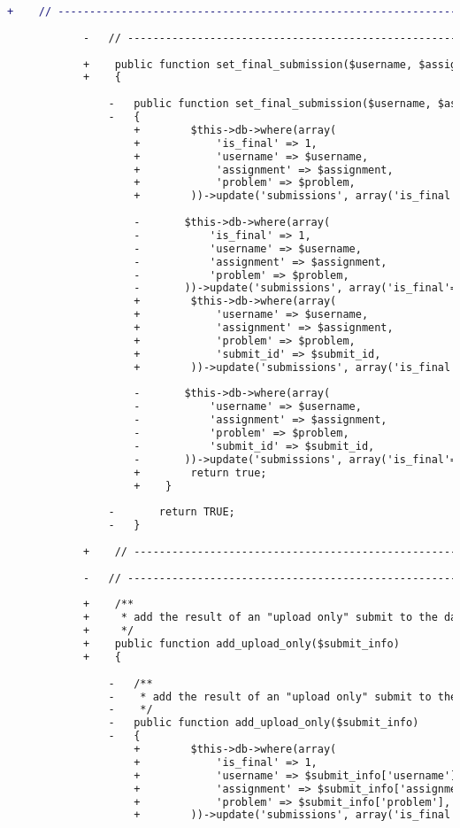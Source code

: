 \begin{lstlisting}[language=diff, caption=Perubahan pada kode Submit\_model.php]
			+    // ------------------------------------------------------------------------
			
			-	// ------------------------------------------------------------------------
			
			+    public function set_final_submission($username, $assignment, $problem, $submit_id)
			+    {
				
				-	public function set_final_submission($username, $assignment, $problem, $submit_id)
				-	{
					+        $this->db->where(array(
					+            'is_final' => 1,
					+            'username' => $username,
					+            'assignment' => $assignment,
					+            'problem' => $problem,
					+        ))->update('submissions', array('is_final' => 0));
					
					-		$this->db->where(array(
					-			'is_final' => 1,
					-			'username' => $username,
					-			'assignment' => $assignment,
					-			'problem' => $problem,
					-		))->update('submissions', array('is_final'=>0));
					+        $this->db->where(array(
					+            'username' => $username,
					+            'assignment' => $assignment,
					+            'problem' => $problem,
					+            'submit_id' => $submit_id,
					+        ))->update('submissions', array('is_final' => 1));
					
					-		$this->db->where(array(
					-			'username' => $username,
					-			'assignment' => $assignment,
					-			'problem' => $problem,
					-			'submit_id' => $submit_id,
					-		))->update('submissions', array('is_final'=>1));
					+        return true;
					+    }
				
				-		return TRUE;
				-	}
			
			+    // ------------------------------------------------------------------------
			
			-	// ------------------------------------------------------------------------
			
			+    /**
			+     * add the result of an "upload only" submit to the database
			+     */
			+    public function add_upload_only($submit_info)
			+    {
				
				-	/**
				-	 * add the result of an "upload only" submit to the database
				-	 */
				-	public function add_upload_only($submit_info)
				-	{
					+        $this->db->where(array(
					+            'is_final' => 1,
					+            'username' => $submit_info['username'],
					+            'assignment' => $submit_info['assignment'],
					+            'problem' => $submit_info['problem'],
					+        ))->update('submissions', array('is_final' => 0));
					

\end{lstlisting}
